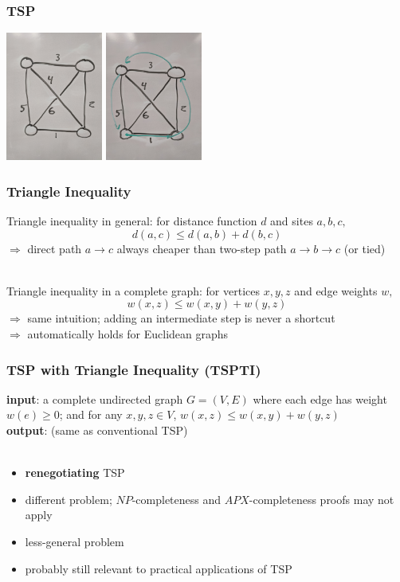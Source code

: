 \documentclass[10pt,aspectratio=169]{beamer}
\newcommand{\stanza}{ \\~\ }
\begin{document}
  \begin{frame} \frametitle{TSP}
    \begin{center}
      \includegraphics[height=120pt]{13-tsp-input.jpg}
      \includegraphics[height=120pt]{13-tsp-output.jpg}
    \end{center}
  \end{frame}
  
  \begin{frame} \frametitle{Triangle Inequality}
  Triangle inequality in general: for distance function $d$ and sites $a, b, c,$
  \[ d(a, c) \leq d(a, b) + d(b, c) \]
  $\Rightarrow$ direct path $a \rightarrow c$ always cheaper than two-step path
  $a \rightarrow b \rightarrow c$ (or tied) \stanza
  
  Triangle inequality in a complete graph: for vertices $x, y, z$ and edge weights $w,$
  \[ w(x, z) \leq w(x, y) + w(y, z) \]
  $\Rightarrow$ same intuition; adding an intermediate step is never a shortcut \\
  $\Rightarrow$ automatically holds for Euclidean graphs
  \end{frame}
  
  \begin{frame} \frametitle{TSP with Triangle Inequality (TSPTI)}
  
  \textbf{input}: a complete undirected graph $G=(V,E)$ where each edge has weight $w(e) \geq 0$;
  and for any $x, y, z \in V$, $w(x, z) \leq w(x, y) + w(y, z)$ \\
  \textbf{output}: (same as conventional TSP) \stanza
  \begin{itemize}
    \item \textbf{renegotiating} TSP
    \item different problem; $NP$-completeness and $APX$-completeness proofs may not apply
    \item less-general problem
    \item probably still relevant to practical applications of TSP
  \end{itemize}
  \end{frame}
  
\end{document}
